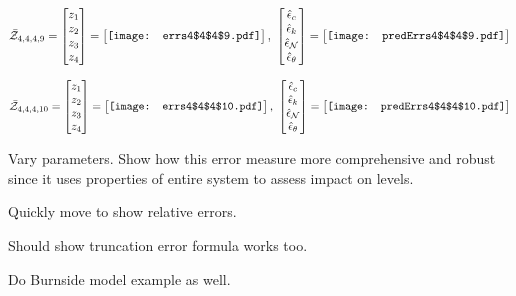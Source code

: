\documentclass[12pt]{article}
\begin{document}
\begin{gather*}
\bar{\mathcal{Z}}_{4,4,4,9}=\begin{bmatrix}
z_1\\
z_2\\
z_3\\
z_4
 \end{bmatrix}= \begin{bmatrix}
\vcenter{\hbox{\texttt{[image: errs4\$4\$4\$9.pdf]}}}
 \end{bmatrix},\,\, \begin{bmatrix}
\hat{\epsilon}_c\\\hat{\epsilon}_k\\\hat{\epsilon}_\mathcal{N}\\\hat{\epsilon}_\theta
 \end{bmatrix}=\begin{bmatrix}
\vcenter{\hbox{\texttt{[image: predErrs4\$4\$4\$9.pdf]}}}
 \end{bmatrix}
\end{gather*}

\begin{gather*}
\bar{\mathcal{Z}}_{4,4,4,10}=\begin{bmatrix}
z_1\\
z_2\\
z_3\\
z_4
 \end{bmatrix}= \begin{bmatrix}
\vcenter{\hbox{\texttt{[image: errs4\$4\$4\$10.pdf]}}}
 \end{bmatrix},\,\, \begin{bmatrix}
\hat{\epsilon}_c\\\hat{\epsilon}_k\\\hat{\epsilon}_\mathcal{N}\\\hat{\epsilon}_\theta
 \end{bmatrix}=\begin{bmatrix}
\vcenter{\hbox{\texttt{[image: predErrs4\$4\$4\$10.pdf]}}}
 \end{bmatrix}
\end{gather*}

Vary parameters.  Show how this error measure more comprehensive and robust
since it uses properties of entire system to assess impact on levels.

Quickly move to show relative errors.

Should show truncation error formula works too.

Do Burnside model example as well.
\end{document}

